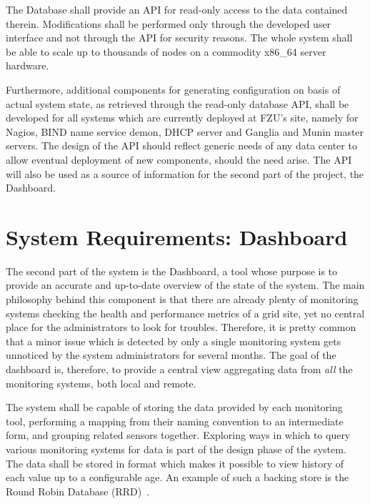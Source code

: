 \documentclass[12pt]{article}
\begin{document}
The Database shall provide an API for read-only access to the data contained therein.  Modifications shall be performed only
through the developed user interface and not through the API for security reasons.  The whole system shall be able to scale up to
thousands of nodes on a commodity x86\_64 server hardware.

Furthermore, additional components for generating configuration on basis of actual system state, as retrieved through the
read-only database API, shall be developed for all systems which are currently deployed at FZU's site, namely for Nagios, BIND
name service demon, DHCP server and Ganglia and Munin master servers.  The design of the API should reflect generic needs of any
data center to allow eventual deployment of new components, should the need arise.  The API will also be used as a source of
information for the second part of the project, the Dashboard.

\section{System Requirements: Dashboard}

The second part of the system is the Dashboard, a tool whose purpose is to provide an accurate and up-to-date overview of the
state of the system.  The main philosophy behind this component is that there are already plenty of monitoring systems checking
the health and performance metrics of a grid site, yet no central place for the administrators to look for troubles.  Therefore,
it is pretty common that a minor issue which is detected by only a single monitoring system gets unnoticed by the system
administrators for several months.  The goal of the dashboard is, therefore, to provide a central view aggregating data from {\em
all} the monitoring systems, both local and remote.

The system shall be capable of storing the data provided by each monitoring tool, performing a mapping from their naming
convention to an intermediate form, and grouping related sensors together.  Exploring ways in which to query various monitoring
systems for data is part of the design phase of the system.  The data shall be stored in format which makes it possible to view
history of each value up to a configurable age.  An example of such a backing store is the Round Robin Database (RRD)~\cite{rrd}.
\end{document}

